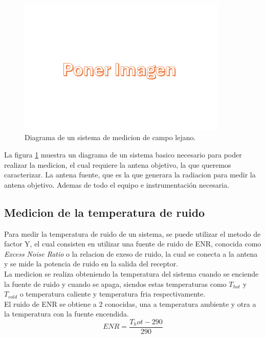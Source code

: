 \begin{figure}
    \centering
    \includegraphics[width = 10cm]{img/imagen.png}
    \caption{Diagrama de un sistema de medicion de campo lejano.}
    \label{fig:farfield}
\end{figure}

La figura \ref{fig:farfield} muestra un diagrama de un sistema basico necesario para poder realizar la medicion, el cual requiere la antena objetivo, la que queremos caracterizar. La antena fuente, que es la que generara la radiacion para medir la antena objetivo. Ademas de todo el equipo e instrumentación necesaria.\\

\subsection{Medicion de la temperatura de ruido}

Para medir la temperatura de ruido de un sistema, se puede utilizar el metodo de factor Y, el cual consisten en utilizar una fuente de ruido de ENR, conocida como \textit{Excess Noise Ratio} o la relacion de exeso de ruido, la cual se conecta a la antena y se mide la potencia de ruido en la salida del receptor.\\

La medicion se realiza obteniendo la temperatura del sistema cuando se enciende la fuente de ruido y cuando se apaga, siendos estas temperaturas como $T_{hot}$ y $T_{cold}$ o temperatura caliente y temperatura fria respectivamente.\\

El ruido de ENR se obtiene a 2  conocidas, una a temperatura ambiente y otra a la temperatura con la fuente encendida.\\

\begin{equation}
    ENR = \frac{T_hot - 290}{290}
\end{equation}

